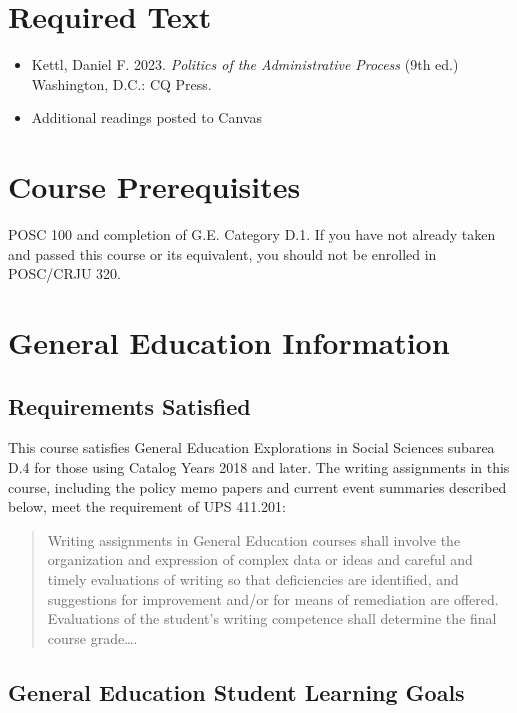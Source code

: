 \documentclass[12pt, letterpaper]{article}
\begin{document}
\section{Required Text}

\begin{itemize}
    \item Kettl, Daniel F. 2023. \emph{Politics of the Administrative Process} (9th ed.) Washington, D.C.: CQ Press.
    \item Additional readings posted to Canvas
\end{itemize}

\section{Course Prerequisites}

POSC 100 and completion of G.E. Category D.1.  If you have not already taken and passed this course or its equivalent, you should not be enrolled in POSC/CRJU 320.

\section{General Education Information}


\subsection*{Requirements Satisfied}

	This course satisfies General Education Explorations in Social Sciences subarea D.4 for those using Catalog Years 2018 and later. The writing assignments in this course, including the policy memo papers and current event summaries described below, meet the requirement of UPS 411.201: 
	\begin{quote}Writing assignments in General Education courses shall involve the organization and expression of complex data or ideas and careful and timely evaluations of writing so that deficiencies are identified, and suggestions for improvement and/or for means of remediation are offered. Evaluations of the student's writing competence shall determine the final course grade\ldots .\end{quote}

\subsection*{General Education Student Learning Goals}
\end{document}
